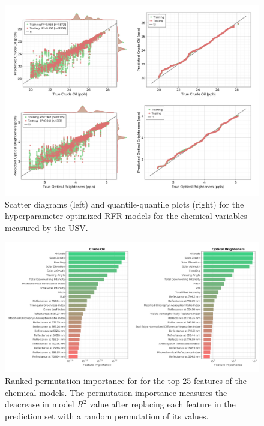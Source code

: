 \documentclass[remotesensing,article,submit,pdftex,moreauthors]{Definitions/mdpi}
\begin{document}
\begin{figure}
\centering
\includegraphics[width=\columnwidth]{paper/figures/results/fits/chemical-fitres.png}
\caption{Scatter diagrams (left) and quantile-quantile plots (right) for the hyperparameter optimized RFR models for the chemical variables measured by the USV.\label{fig:chemicals-fit}}
\end{figure}  

\begin{figure}
\centering
\includegraphics[width=\columnwidth]{paper/figures/results/fits/chemical-ranking.pdf}
\caption{Ranked permutation importance for for the top 25 features of the chemical models. The permutation importance measures the deacrease in model $R^2$ value after replacing each feature in the prediction set with a random permutation of its values.\label{fig:chemicals-fi}}
\end{figure}  
\end{document}
